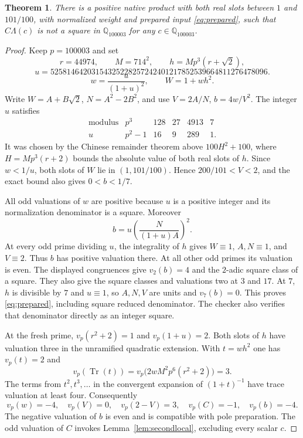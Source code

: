 \documentclass[11pt,a4paper]{article}
\newcommand{\Q}{\mathbb Q}\newcommand{\Z}{\mathbb Z}
\newcommand{\Tr}{\operatorname{Tr}}\newcommand{\Nm}{\operatorname{N}}
\newtheorem{theorem}[lemma]{Theorem}
\begin{document}
\begin{theorem}\label{thm:second}
There is a positive native product with both real slots between
$1$ and $101/100$, with normalized weight and prepared input
\eqref{eq:prepared}, such that $C\Lambda(c)$ is not a square
in $\Q_{100003}$ for any $c\in\Q_{100003}$.
\end{theorem}
\begin{proof}
Keep $p=100003$ and set
\[
 r=44974,\qquad M=714^2,\qquad
 h=Mp^3(r+\sqrt2),
\]
\[
 u=52581464203154325228257242401217852539664811276478096.
\]
\[
 w=\frac{u}{(1+u)^2},\qquad W=1+wh^2.
\]
Write $W=A+B\sqrt2$, $N=A^2-2B^2$, and use
$V=2A/N$, $b=4w/V^2$. The integer $u$ satisfies
\[
 \begin{array}{c|ccccc}
 \text{modulus}&p^3&128&27&4913&7\\\hline
 u& p^2-1&16&9&289&1.
 \end{array}
\]
It was chosen by the Chinese remainder theorem above
$100H^2+100$, where $H=Mp^3(r+2)$ bounds the absolute
value of both real slots of $h$. Since $w<1/u$, both slots
of $W$ lie in $(1,101/100)$. Hence $200/101<V<2$,
and the exact bound also gives $0<b<1/7$.

All odd valuations of $w$ are positive because $u$ is a positive
integer and its normalization denominator is a square. Moreover
\begin{equation}\label{eq:bsquareclass}
                         b=u\left(\frac{N}{(1+u)A}\right)^2.
\end{equation}
At every odd prime dividing $u$, the integrality of $h$ gives
$W\equiv1$, $A,N\equiv1$, and $V\equiv2$. Thus $b$ has
positive valuation there. At all other odd primes its valuation
is even. The displayed congruences give $v_2(b)=4$ and the
$2$-adic square class of a square. They also give the square
classes and valuations two at $3$ and $17$. At $7$, $h$ is
divisible by $7$ and $u\equiv1$, so $A,N,V$ are units and
$v_7(b)=0$. This proves \eqref{eq:prepared}, including square
reduced denominator. The checker also verifies that denominator
directly as an integer square.

At the fresh prime, $v_p(r^2+2)=1$ and $v_p(1+u)=2$.
Both slots of $h$ have valuation three in the unramified
quadratic extension. With $t=wh^2$ one has $v_p(t)=2$ and
\[
 v_p(\Tr(t))=v_p\bigl(2wM^2p^6(r^2+2)\bigr)=3.
\]
The terms from $t^2,t^3,\ldots$ in the convergent expansion of
$(1+t)^{-1}$ have trace valuation at least four. Consequently
\[
 v_p(w)=-4,\quad v_p(V)=0,\quad v_p(2-V)=3,
 \quad v_p(C)=-1,\quad v_p(b)=-4.
\]
The negative valuation of $b$ is even and is compatible with
pole preparation. The odd valuation of $C$ invokes
Lemma~\ref{lem:secondlocal}, excluding every scalar $c$.
\end{proof}
\end{document}
